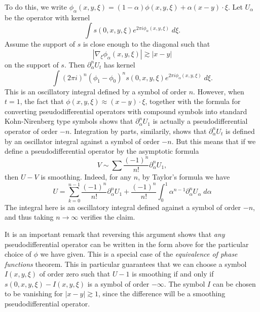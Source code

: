 To do this, we write $\phi_\alpha(x,y,\xi) = (1 - \alpha) \phi(x,y,\xi) + \alpha (x - y) \cdot \xi$. Let $U_\alpha$ be the operator with kernel
%
\[ \int s(0,x,y,\xi) e^{2 \pi i \phi_\alpha(x,y,\xi)}\; d\xi. \]
%
Assume the support of $s$ is close enough to the diagonal such that
%
\[ |\nabla_\xi \phi_\alpha(x,y,\xi)| \gtrsim |x - y| \]
%
on the support of $s$. Then $\partial_\alpha^n U_t$ has kernel
%
\[ \int (2 \pi i)^n ( \phi_1 - \phi_0 )^n s(0,x,y,\xi) e^{2 \pi i \phi_\alpha(x,y,\xi)}\; d\xi. \]
%
This is an oscillatory integral defined by a symbol of order $n$. However, when $t = 1$, the fact that $\phi(x,y,\xi) \approx (x - y) \cdot \xi$, together with the formula for converting pseudodifferential operators with compound symbols into standard Kohn-Nirenberg type symbols shows that $\partial_\alpha^n U_1$ is actually a pseudodifferential operator of order $-n$. Integration by parts, similarily, shows that $\partial_\alpha^n U_t$ is defined by an oscillator integral against a symbol of order $-n$. But this means that if we define a pseudodifferential operator by the asymptotic formula
%
\[ V \sim \sum \frac{(-1)^n}{n!} \partial_\alpha^n U_1, \]
%
then $U - V$ is smoothing. Indeed, for any $n$, by Taylor's formula we have
%
\[ U = \sum_{k = 0}^{n-1} \frac{(-1)^n}{n!} \partial_\alpha^n U_1 + \frac{(-1)^n}{n!} \int_0^1 \alpha^{n-1} \partial_\alpha^n U_\alpha\; d\alpha \]
%
The integral here is an oscillatory integral defined against a symbol of order $-n$, and thus taking $n \to \infty$ verifies the claim.

It is an important remark that reversing this argument shows that \emph{any} pseudodifferential operator can be written in the form above for the particular choice of $\phi$ we have given. This is a special case of the \emph{equivalence of phase functions} theorem. This in particular guarantees that we can choose a symbol $I(x,y,\xi)$ of order zero such that $U - 1$ is smoothing if and only if $s(0,x,y,\xi) - I(x,y,\xi)$ is a symbol of order $-\infty$. The symbol $I$ can be chosen to be vanishing for $|x - y| \gtrsim 1$, since the difference will be a smoothing pseudodifferential operator.

